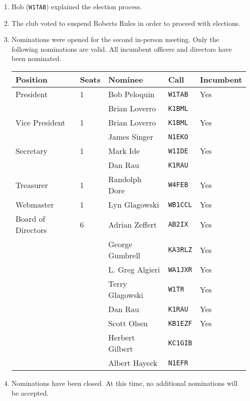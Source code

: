 \documentclass[10pt,letterpaper]{article}
\begin{document}
\begin{enumerate}
  \item Bob (\texttt{W1TAB}) explained the election process.
  \item The club voted to suspend Roberts Rules in order to proceed with elections.
  \item Nominations were opened for the second in-person meeting. Only the following nominations are valid. All incumbent officers and directors have been nominated.

  \begin{tabular}{|ll|lll|}
    \hline
    \textbf{Position} & \textbf{Seats} & \textbf{Nominee} & \textbf{Call} & \textbf{Incumbent} \\ \hline
    President & 1 & Bob Peloquin & \texttt{W1TAB} & Yes \\
     &  & Brian Loverro & \texttt{K1BML} & \\ \hline
    Vice President & 1 & Brian Loverro & \texttt{K1BML} & Yes \\
     &  & James Singer & \texttt{N1EKO} & \\ \hline
    Secretary & 1 & Mark Ide & \texttt{W1IDE} & Yes \\
     & & Dan Rau & \texttt{K1RAU} &  \\ \hline
    Treasurer & 1 & Randolph Dore & \texttt{W4FEB} & Yes \\ \hline
    Webmaster & 1 & Lyn Glagowski & \texttt{WB1CCL} & Yes \\ \hline

    Board of Directors & 6 & Adrian Zeffert & \texttt{AB2IX} & Yes\\
    & & George Gumbrell& \texttt{KA3RLZ} & Yes \\
    & & L. Greg Algieri & \texttt{WA1JXR} & Yes \\
    & & Terry Glagowski & \texttt{W1TR} & Yes \\
    & & Dan Rau & \texttt{K1RAU} & Yes \\
    & & Scott Olsen & \texttt{KB1EZF} & Yes \\
    & & Herbert Gilbert & \texttt{KC1GIB}& \\
    & & Albert Hayeck & \texttt{N1EFR}& \\ \hline
  \end{tabular}
  \item Nominations have been closed. At this time, no additional nominations will be accepted.

\end{enumerate}
\end{document}
